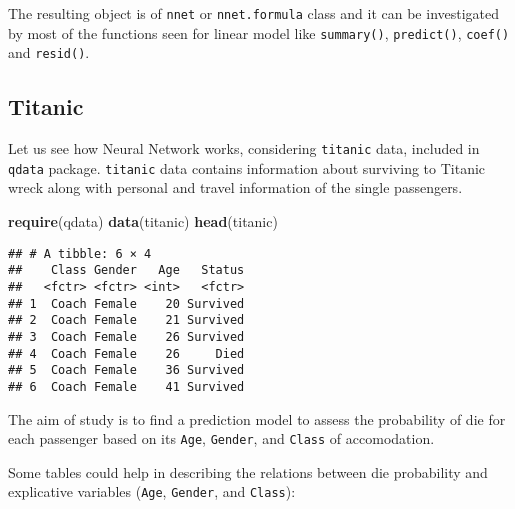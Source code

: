 \documentclass[]{book}
\newenvironment{Shaded}{\begin{snugshade}}{\end{snugshade}}
\newcommand{\KeywordTok}[1]{\textcolor[rgb]{0.13,0.29,0.53}{\textbf{{#1}}}}
\newcommand{\DataTypeTok}[1]{\textcolor[rgb]{0.13,0.29,0.53}{{#1}}}
\newcommand{\DecValTok}[1]{\textcolor[rgb]{0.00,0.00,0.81}{{#1}}}
\newcommand{\StringTok}[1]{\textcolor[rgb]{0.31,0.60,0.02}{{#1}}}
\newcommand{\CommentTok}[1]{\textcolor[rgb]{0.56,0.35,0.01}{\textit{{#1}}}}
\newcommand{\NormalTok}[1]{{#1}}
\begin{document}
The resulting object is of \texttt{nnet} or \texttt{nnet.formula} class
and it can be investigated by most of the functions seen for linear
model like \texttt{summary()}, \texttt{predict()}, \texttt{coef()} and
\texttt{resid()}.

\subsection{Titanic}\label{titanic}

Let us see how Neural Network works, considering \texttt{titanic} data,
included in \texttt{qdata} package. \texttt{titanic} data contains
information about surviving to Titanic wreck along with personal and
travel information of the single passengers.

\begin{Shaded}
\begin{Highlighting}[]
\KeywordTok{require}\NormalTok{(qdata)}
\KeywordTok{data}\NormalTok{(titanic)}
\KeywordTok{head}\NormalTok{(titanic)}
\end{Highlighting}
\end{Shaded}

\begin{verbatim}
## # A tibble: 6 × 4
##    Class Gender   Age   Status
##   <fctr> <fctr> <int>   <fctr>
## 1  Coach Female    20 Survived
## 2  Coach Female    21 Survived
## 3  Coach Female    26 Survived
## 4  Coach Female    26     Died
## 5  Coach Female    36 Survived
## 6  Coach Female    41 Survived
\end{verbatim}

The aim of study is to find a prediction model to assess the probability
of die for each passenger based on its \texttt{Age}, \texttt{Gender},
and \texttt{Class} of accomodation.

Some tables could help in describing the relations between die
probability and explicative variables (\texttt{Age}, \texttt{Gender},
and \texttt{Class}):

\begin{Shaded}
\end{Shaded}
\end{document}
